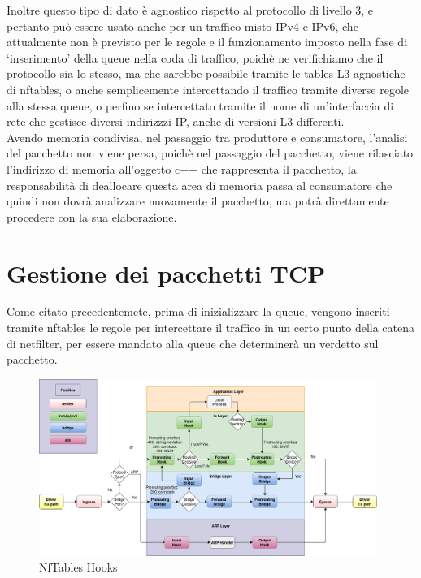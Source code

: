 Inoltre questo tipo di dato è agnostico rispetto al protocollo di livello 3, e pertanto può essere usato anche per un traffico misto IPv4 e IPv6, che attualmente
non è previsto per le regole e il funzionamento imposto nella fase di `inserimento' della queue nella coda di traffico, poichè ne verifichiamo che il protocollo
sia lo stesso, ma che sarebbe possibile tramite le tables L3 agnostiche di nftables, o anche semplicemente intercettando il traffico tramite diverse regole alla stessa queue,
o perfino se intercettato tramite il nome di un'interfaccia di rete che gestisce diversi indirizzzi IP, anche di versioni L3 differenti.\\
Avendo memoria condivisa, nel passaggio tra produttore e consumatore, l'analisi del pacchetto non viene persa, poichè nel passaggio del pacchetto, viene rilasciato l'indirizzo
di memoria all'oggetto c++ che rappresenta il pacchetto, la responsabilità di deallocare questa area di memoria passa al consumatore che quindi non dovrà
analizzare nuovamente il pacchetto, ma potrà direttamente procedere con la sua elaborazione.

\section{Gestione dei pacchetti TCP}

Come citato precedentemete, prima di inizializzare la queue, vengono inseriti tramite nftables le regole per intercettare il traffico in un certo punto della catena
di netfilter, per essere mandato alla queue che determinerà un verdetto sul pacchetto.\\

\begin{figure}[H]
    \centering
    \includegraphics[width=0.98\textwidth]{images/chapter3/nf-hooks.png}
    \caption{NfTables Hooks}\label{fig:nftables_hooks}
\end{figure}


